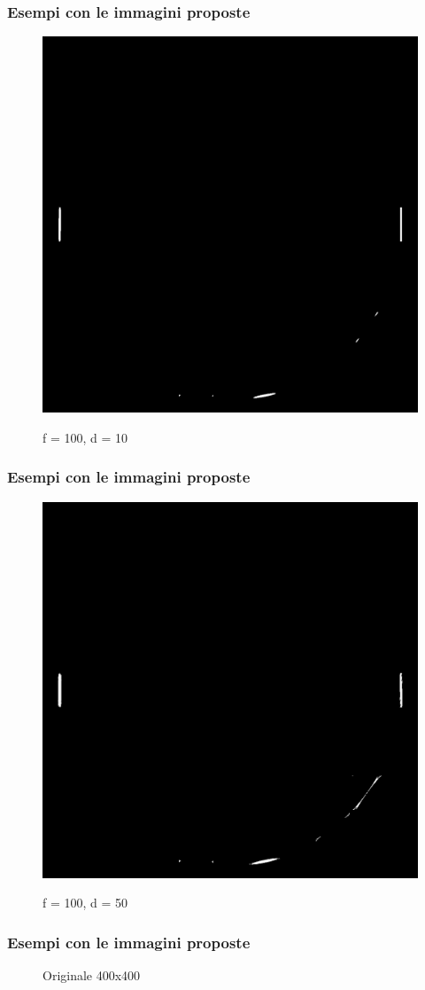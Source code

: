 \documentclass{beamer}
\begin{document}
\begin{frame}
	\frametitle{Esempi con le immagini proposte}
	\begin{figure}
		{\includegraphics[width=.4\linewidth]{../images/circle-compressed-100-10.png}}
		\caption{f = 100, d = 10}
	\end{figure}
\end{frame}

\begin{frame}
	\frametitle{Esempi con le immagini proposte}
	\begin{figure}
		{\includegraphics[width=.4\linewidth]{../images/circle-compressed-100-50.png}}
		\caption{f = 100, d = 50}
	\end{figure}
\end{frame}

\begin{frame}
	\frametitle{Esempi con le immagini proposte}
	\begin{figure}
		\caption{Originale 400x400}
	\end{figure}
\end{frame}
\end{document}
